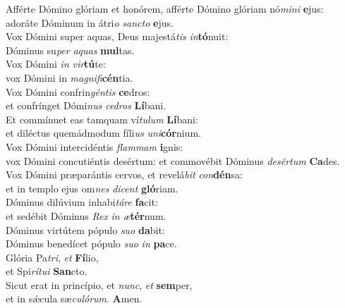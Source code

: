 \evenverse Afférte Dómino glóriam et honórem, afférte Dómino glóriam nó\textit{mi}\textit{ni} \textbf{e}jus:~\*\\
\evenverse adoráte Dóminum in átri\textit{o} \textit{san}\textit{cto} \textbf{e}jus.\\
\oddverse Vox Dómini super aquas, Deus majestá\textit{tis} \textit{in}\textbf{tó}nuit:~\*\\
\oddverse Dóminus su\textit{per} \textit{a}\textit{quas} \textbf{mul}tas.\\
\evenverse Vox Dómini \textit{in} \textit{vir}\textbf{tú}te:~\*\\
\evenverse vox Dómini in \textit{ma}\textit{gni}\textit{fi}\textbf{cén}tia.\\
\oddverse Vox Dómini confrin\textit{gén}\textit{tis} \textbf{ce}dros:~\*\\
\oddverse et confrínget Dómi\textit{nus} \textit{ce}\textit{dros} \textbf{Lí}bani.\\
\evenverse Et commínuet eas tamquam ví\textit{tu}\textit{lum} \textbf{Lí}bani:~\*\\
\evenverse et diléctus quemádmodum fíli\textit{us} \textit{u}\textit{ni}\textbf{cór}nium.\\
\oddverse Vox Dómini intercidéntis \textit{flam}\textit{mam} \textbf{i}gnis:~\*\\
\oddverse vox Dómini concutiéntis desértum: et commovébit Dóminus \textit{de}\textit{sér}\textit{tum} \textbf{Ca}des.\\
\evenverse Vox Dómini præparántis cervos, et revelá\textit{bit} \textit{con}\textbf{dén}sa:~\*\\
\evenverse et in templo ejus om\textit{nes} \textit{di}\textit{cent} \textbf{gló}riam.\\
\oddverse Dóminus dilúvium inhabi\textit{tá}\textit{re} \textbf{fa}cit:~\*\\
\oddverse et sedébit Dóminus \textit{Rex} \textit{in} \textit{æ}\textbf{tér}num.\\
\evenverse Dóminus virtútem pópulo \textit{su}\textit{o} \textbf{da}bit:~\*\\
\evenverse Dóminus benedícet pópulo \textit{su}\textit{o} \textit{in} \textbf{pa}ce.\\
\oddverse Glória Pa\textit{tri}, \textit{et} \textbf{Fí}lio,~\*\\
\oddverse et Spi\textit{rí}\textit{tu}\textit{i} \textbf{San}cto.\\
\evenverse Sicut erat in princípio, et \textit{nunc}, \textit{et} \textbf{sem}per,~\*\\
\evenverse et in sǽcula sæ\textit{cu}\textit{ló}\textit{rum}. \textbf{A}men.\\
